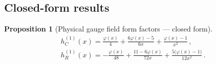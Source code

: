 \documentclass[12pt,a4paper]{article}
\newtheorem{proposition}{Proposition}[section]
\theoremstyle{definition}
\theoremstyle{remark}
\begin{document}
\subsection{Closed-form results}

\begin{proposition}[Physical gauge field form factors --- closed form]
\label{prop:final-ff}
\begin{align}
  \boxed{
  h_C^{(1)}(x) = \frac{\varphi(x)}{4}
    + \frac{6\varphi(x) - 5}{6x}
    + \frac{\varphi(x) - 1}{x^2}\,,
  }
  \label{eq:hC-vector-final}\\[8pt]
  \boxed{
  h_R^{(1)}(x) = -\frac{\varphi(x)}{48}
    + \frac{11 - 6\varphi(x)}{72x}
    + \frac{5\bigl(\varphi(x) - 1\bigr)}{12x^2}\,.
  }
  \label{eq:hR-vector-final}
\end{align}
\end{proposition}
\end{document}
